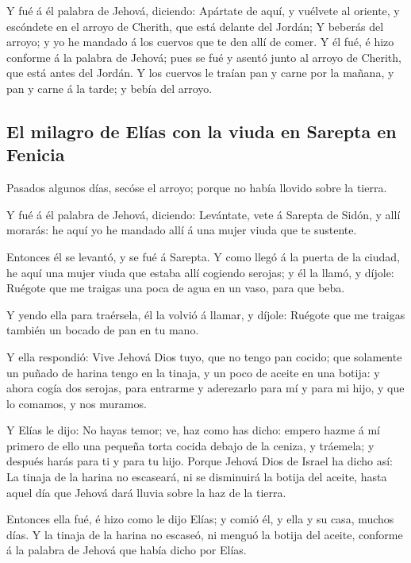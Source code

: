  Y fué á él palabra de Jehová, diciendo: 
Apártate de aquí, y vuélvete al oriente, y escóndete en el arroyo de
Cherith, que está delante del Jordán;  Y beberás del arroyo;
y yo he mandado á los cuervos que te den allí de comer.  Y
él fué, é hizo conforme á la palabra de Jehová; pues se fué y asentó
junto al arroyo de Cherith, que está antes del Jordán.  Y
los cuervos le traían pan y carne por la mañana, y pan y carne á la
tarde; y bebía del arroyo.

\hypertarget{el-milagro-de-eluxedas-con-la-viuda-en-sarepta-en-fenicia}{%
\subsection{El milagro de Elías con la viuda en Sarepta en
Fenicia}\label{el-milagro-de-eluxedas-con-la-viuda-en-sarepta-en-fenicia}}

 Pasados algunos días, secóse el arroyo; porque no había
llovido sobre la tierra.

 Y fué á él palabra de Jehová, diciendo: 
Levántate, vete á Sarepta de Sidón, y allí morarás: he aquí yo he
mandado allí á una mujer viuda que te sustente.

 Entonces él se levantó, y se fué á Sarepta. Y como llegó á
la puerta de la ciudad, he aquí una mujer viuda que estaba allí cogiendo
serojas; y él la llamó, y díjole: Ruégote que me traigas una poca de
agua en un vaso, para que beba.

 Y yendo ella para traérsela, él la volvió á llamar, y
díjole: Ruégote que me traigas también un bocado de pan en tu mano.

 Y ella respondió: Vive Jehová Dios tuyo, que no tengo pan
cocido; que solamente un puñado de harina tengo en la tinaja, y un poco
de aceite en una botija: y ahora cogía dos serojas, para entrarme y
aderezarlo para mí y para mi hijo, y que lo comamos, y nos muramos.

 Y Elías le dijo: No hayas temor; ve, haz como has dicho:
empero hazme á mí primero de ello una pequeña torta cocida debajo de la
ceniza, y tráemela; y después harás para ti y para tu hijo.
 Porque Jehová Dios de Israel ha dicho así: La tinaja de la
harina no escaseará, ni se disminuirá la botija del aceite, hasta aquel
día que Jehová dará lluvia sobre la haz de la tierra.

 Entonces ella fué, é hizo como le dijo Elías; y comió él,
y ella y su casa, muchos días.  Y la tinaja de la harina no
escaseó, ni menguó la botija del aceite, conforme á la palabra de Jehová
que había dicho por Elías.

